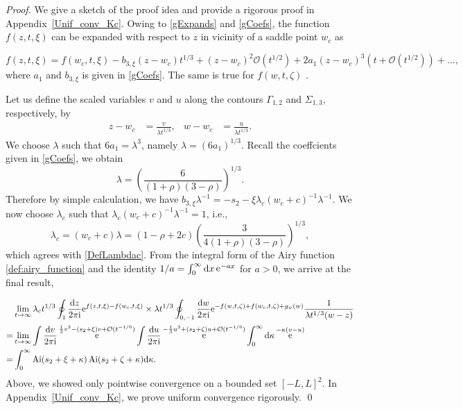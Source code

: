 \documentclass[cmp]{svjour}
\numberwithin{theorem}{section}
\numberwithin{equation}{section}
\DeclareMathOperator{\e}{e}
\DeclareMathOperator{\Ai}{Ai}
\def\dd{{\rm d}}
\def\ii{{\rm i}}
\begin{document}
\begin{proof}
We give a sketch of the proof idea and provide a rigorous proof in Appendix~\ref{Unif_conv_Kc}.
Owing to \eqref{gExpands} and \eqref{gCoefs}, the function $f(z,t,\xi)$ can be expanded with respect to $z$ in vicinity of a saddle point $w_c$ as

\begin{equation*}
f(z ,t , \xi ) = f(w_c,t, \xi) -
b_{3,\xi}(z - w_c)t^{1/3} + (z-w_c)^2\mathcal{O}(t^{1/2}) +
2 a_1 {(z - w_c)}^3 (t+\mathcal{O}(t^{1/2}))  + \ldots ,
\end{equation*}
where $a_1$ and $b_{3,\xi}$ is given in \eqref{gCoefs}. The same is true for $f(w ,t , \zeta )$ .



Let us define the scaled variables $v$ and $u$ along the contours $\Gamma_{1,2}$ and $\Sigma_{1,3}$, respectively, by
\begin{align*}
z - w_c &= \frac{v}{ \lambda t^{1/3}}, & w - w_c & = \frac{u}{\lambda t^{1/3}}.
\end{align*}
We choose $\lambda$ such that $6a_1=\lambda^3$, namely $\lambda=(6a_1)^{1/3}$. Recall the coeffcients given in \eqref{gCoefs}, we obtain 
\begin{equation}\label{DefNormalLambda}
	\lambda = {\left( \frac{6}{(1 + \rho)(3 - \rho)} \right)}^{1/3}.
\end{equation}
Therefore by simple calculation, we have $b_{3, \xi} \lambda^{-1} = - s_2 - \xi \lambda_c (w_c + c)^{-1} \lambda^{-1}$. We now choose $\lambda_c$ such that $\lambda_c (w_c + c)^{-1} \lambda^{-1}=1$, i.e., 
\begin{equation*}
	\lambda_c = (w_c + c) \lambda = (1 - \rho + 2c ) {\left( \frac{3}{4 (1 + \rho) (3 - \rho)} \right)}^{1/3} ,
\end{equation*}
which agrees with \eqref{DefLambdac}.
From the integral form of the Airy function \eqref{def:airy_function} and the identity $1/ a = \int_{0}^{\infty} \dd x \e^{-a x}$ for $a > 0$, we arrive at the final result,


\begin{equation*}
\begin{split}
& \lim_{t \rightarrow \infty} \lambda_c t^{1/3} \oint_{1} \frac{\mathrm{d} z}{2 \pi \ii} \mathrm{e}^{ f(z , t , \xi) - f(w_c , t , \xi) } \times \lambda t^{1/3} \oint_{0 , -1} \frac{\mathrm{d} w}{2 \pi \ii} \mathrm{e}^{ - f(w , t , \zeta) + f(w_c , t , \zeta) + g_{\psi}(w)} \frac{1}{\lambda t^{1/3} (w-z)} \\
= & \lim_{t \rightarrow \infty} \int \frac{\dd v}{2 \pi \ii} \e^{ \frac{1}{3} v^3 - (s_2 + \xi) v + \mathcal{O}(t^{-1/6}) } \int \frac{\dd u}{2 \pi \ii} \e^{ - \frac{1}{3} u^3 + (s_2 + \zeta) u + \mathcal{O}(t^{-1/6}) } \int_{0}^{\infty} \dd \kappa \e^{ - \kappa(v - u) } \\
= & \int_0^{\infty} \Ai(s_2+\xi+\kappa)\Ai(s_2+\zeta+\kappa) \dd \kappa.
\end{split} 
\end{equation*}
Above, we showed only pointwise convergence on a bounded set ${[-L, L]}^2$.
In Appendix~\ref{Unif_conv_Kc}, we prove uniform convergence rigorously. \qed

\end{proof}
\end{document}
